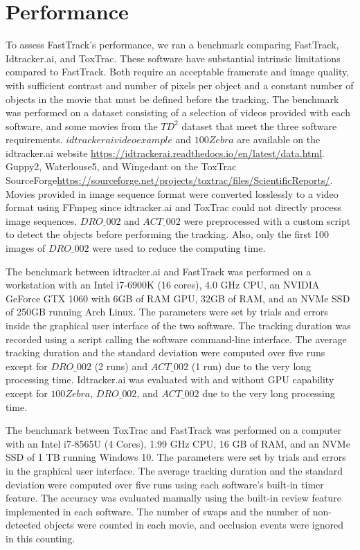     \section{Performance}
    To assess FastTrack's performance, we ran a benchmark comparing FastTrack, Idtracker.ai, and ToxTrac. These software have substantial intrinsic limitations compared to FastTrack. Both require an acceptable framerate and image quality, with sufficient contrast and number of pixels per object and a constant number of objects in the movie that must be defined before the tracking. The benchmark was performed on a dataset consisting of a selection of videos provided with each software, and some movies from the $TD^2$ dataset that meet the three software requirements. $idtrackeraivideoexample$ and $100Zebra$ are available on the idtracker.ai website \url{https://idtrackerai.readthedocs.io/en/latest/data.html}. Guppy2, Waterlouse5, and Wingedant on the ToxTrac SourceForge\url{https://sourceforge.net/projects/toxtrac/files/ScientificReports/}. Movies provided in image sequence format were converted losslessly to a video format using FFmpeg since idtracker.ai and ToxTrac could not directly process image sequences. $DRO\_002$ and $ACT\_002$ were preprocessed with a custom script to detect the objects before performing the tracking. Also, only the first 100 images of $DRO\_002$ were used to reduce the computing time.

    The benchmark between idtracker.ai and FastTrack was performed on a workstation with an Intel i7-6900K (16 cores), 4.0 GHz CPU, an NVIDIA GeForce GTX 1060 with 6GB of RAM GPU, 32GB of RAM, and an NVMe SSD of 250GB running Arch Linux. The parameters were set by trials and errors inside the graphical user interface of the two software. The tracking duration was recorded using a script calling the software command-line interface. The average tracking duration and the standard deviation were computed over five runs except for $DRO\_002$  (2 runs) and $ACT\_002$ (1 run) due to the very long processing time. Idtracker.ai was evaluated with and without GPU capability except for $100Zebra$, $DRO\_002$, and $ACT\_002$ due to the very long processing time.

    The benchmark between ToxTrac and FastTrack was performed on a computer with an Intel i7-8565U (4 Cores), 1.99 GHz CPU, 16 GB of RAM, and an NVMe SSD of 1 TB running Windows 10. The parameters were set by trials and errors in the graphical user interface. The average tracking duration and the standard deviation were computed over five runs using each software's built-in timer feature. The accuracy was evaluated manually using the built-in review feature implemented in each software. The number of swaps and the number of non-detected objects were counted in each movie, and occlusion events were ignored in this counting.

